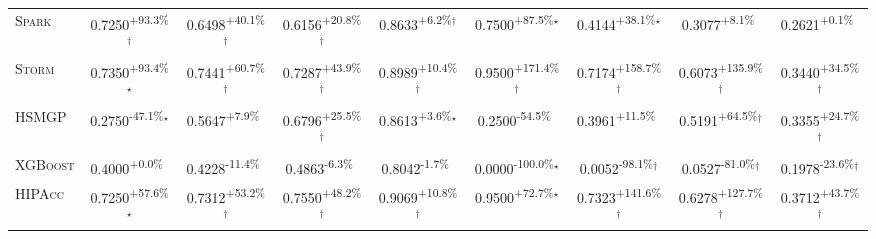 \begin{table}[htbp]
\begin{tabular}{l|cccc|cccc}
\textsc{Spark} & \cellcolor{green!30}0.7250\textsuperscript{+93.3\%}$^\dagger$ & \cellcolor{green!30}0.6498\textsuperscript{+40.1\%}$^\dagger$ & \cellcolor{green!30}0.6156\textsuperscript{+20.8\%}$^\dagger$ & \cellcolor{green!30}0.8633\textsuperscript{+6.2\%}$^\dagger$ & \cellcolor{green!30}0.7500\textsuperscript{+87.5\%}$^\star$ & \cellcolor{green!30}0.4144\textsuperscript{+38.1\%}$^\star$ & \cellcolor{green!30}0.3077\textsuperscript{+8.1\%}$^{\,\,\,}$ & \cellcolor{green!30}0.2621\textsuperscript{+0.1\%}$^{\,\,\,}$ \\
\textsc{Storm} & \cellcolor{green!30}0.7350\textsuperscript{+93.4\%}$^\star$ & \cellcolor{green!30}0.7441\textsuperscript{+60.7\%}$^\dagger$ & \cellcolor{green!30}0.7287\textsuperscript{+43.9\%}$^\dagger$ & \cellcolor{green!30}0.8989\textsuperscript{+10.4\%}$^\dagger$ & \cellcolor{green!30}0.9500\textsuperscript{+171.4\%}$^\dagger$ & \cellcolor{green!30}0.7174\textsuperscript{+158.7\%}$^\dagger$ & \cellcolor{green!30}0.6073\textsuperscript{+135.9\%}$^\dagger$ & \cellcolor{green!30}0.3440\textsuperscript{+34.5\%}$^\dagger$ \\
\textsc{HSMGP} & \cellcolor{red!30}0.2750\textsuperscript{-47.1\%}$^\star$ & \cellcolor{green!30}0.5647\textsuperscript{+7.9\%}$^{\,\,\,}$ & \cellcolor{green!30}0.6796\textsuperscript{+25.5\%}$^\dagger$ & \cellcolor{green!30}0.8613\textsuperscript{+3.6\%}$^\star$ & \cellcolor{red!30}0.2500\textsuperscript{-54.5\%}$^{\,\,\,}$ & \cellcolor{green!30}0.3961\textsuperscript{+11.5\%}$^{\,\,\,}$ & \cellcolor{green!30}0.5191\textsuperscript{+64.5\%}$^\dagger$ & \cellcolor{green!30}0.3355\textsuperscript{+24.7\%}$^\dagger$ \\
\textsc{XGBoost} & \cellcolor{green!30}0.4000\textsuperscript{+0.0\%}$^{\,\,\,}$ & \cellcolor{red!30}0.4228\textsuperscript{-11.4\%}$^{\,\,\,}$ & \cellcolor{red!30}0.4863\textsuperscript{-6.3\%}$^{\,\,\,}$ & \cellcolor{red!30}0.8042\textsuperscript{-1.7\%}$^{\,\,\,}$ & \cellcolor{red!30}0.0000\textsuperscript{-100.0\%}$^\star$ & \cellcolor{red!30}0.0052\textsuperscript{-98.1\%}$^\dagger$ & \cellcolor{red!30}0.0527\textsuperscript{-81.0\%}$^\dagger$ & \cellcolor{red!30}0.1978\textsuperscript{-23.6\%}$^\dagger$ \\
\textsc{HIPAcc} & \cellcolor{green!30}0.7250\textsuperscript{+57.6\%}$^\star$ & \cellcolor{green!30}0.7312\textsuperscript{+53.2\%}$^\dagger$ & \cellcolor{green!30}0.7550\textsuperscript{+48.2\%}$^\dagger$ & \cellcolor{green!30}0.9069\textsuperscript{+10.8\%}$^\dagger$ & \cellcolor{green!30}0.9500\textsuperscript{+72.7\%}$^\star$ & \cellcolor{green!30}0.7323\textsuperscript{+141.6\%}$^\dagger$ & \cellcolor{green!30}0.6278\textsuperscript{+127.7\%}$^\dagger$ & \cellcolor{green!30}0.3712\textsuperscript{+43.7\%}$^\dagger$ \\

\end{tabular}
\end{table}

